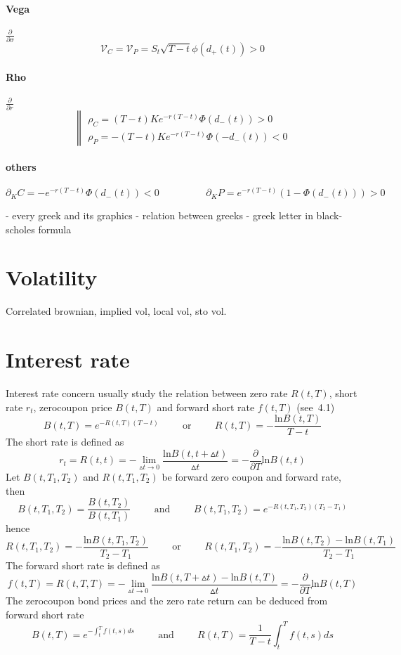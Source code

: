 \documentclass[a4paper,10pt]{article}
\begin{document}
\paragraph{Vega}$\frac{\partial}{\partial \sigma}$
\[
\mathcal{V}_C = \mathcal{V}_P = S_t \sqrt{T-t} \phi(d_+(t))>0
\]
\paragraph{Rho} $\frac{\partial}{\partial r}$
\[
\left\| 
\begin{array}{l}
\rho_C = (T-t)Ke^{-r(T-t)}\Phi(d_-(t))    > 0 \\
\rho_P = -(T-t)Ke^{-r(T-t)}\Phi(-d_-(t))  < 0
\end{array}\right. 
\]
\paragraph{others}
\[
\partial_{K}C = -e^{-r(T-t)} \Phi(d_-(t)) <0
\hspace{2cm}
\partial_{K}P = e^{-r(T-t)} (1-\Phi(d_-(t))) >0
\]

- every greek and its graphics
- relation between greeks
- greek letter in black-scholes formula
\section{Volatility}
Correlated brownian, implied vol, local vol, sto vol.
\section{Interest rate}
Interest rate concern usually study the relation between zero rate $R(t,T)$, short rate $r_t$, zerocoupon price $B(t,T)$ and forward short rate $f(t,T)$ (see~\cite{RUDI}4.1)
\[
B(t,T)=e^{-R(t,T)(T-t)}
\hspace{1cm} \text{or} \hspace{1cm}
R(t,T) = -\frac{\text{ln}B(t,T)}{T-t}
\]
The short rate is defined as
\[
r_t = R(t,t) = -\lim_{\vartriangle t \rightarrow 0} \frac{\text{ln}B(t,t+\vartriangle t)}{\vartriangle t} = -\frac{\partial}{\partial T}\text{ln}B(t,t) 
\]
Let $B(t,T_1,T_2)$ and $R(t,T_1,T_2)$ be forward zero coupon and forward rate, then
\[
B(t,T_1,T_2) = \frac{B(t,T_2)}{B(t,T_1)}
\hspace{1cm} \text{and} \hspace{1cm}
B(t,T_1,T_2) = e^{-R(t,T_1,T_2)(T_2-T_1)}
\]
hence
\[
R(t,T_1,T_2) = - \frac{\text{ln}B(t,T_1,T_2)}{T_2-T_1}
\hspace{1cm} \text{or} \hspace{1cm}
R(t,T_1,T_2) = - \frac{\text{ln}B(t,T_2)-\text{ln}B(t,T_1)}{T_2-T_1}
\]
The forward short rate is defined as
\[
f(t,T)=R(t,T,T) = - \lim_{\vartriangle t \rightarrow 0}  \frac{\text{ln}B(t,T+\vartriangle t)-\text{ln}B(t,T)}{\vartriangle t}
=  -\frac{\partial}{\partial T}\text{ln}B(t,T) 
\]
The zerocoupon bond prices and the zero rate return can be deduced from forward short rate
\[
B(t,T) = e^{-\int_t^Tf(t,s)ds}
\hspace{1cm} \text{and} \hspace{1cm}
R(t,T) = \frac{1}{T-t}\int_t^T f(t,s)ds
\]
\end{document}
